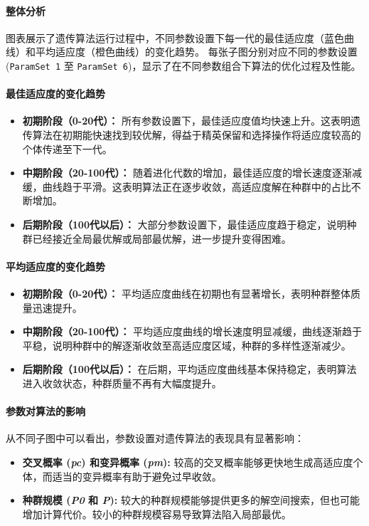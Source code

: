 \documentclass[journal,twoside,web]{ieeecolor}
\begin{document}
\paragraph{整体分析}
图表展示了遗传算法运行过程中，不同参数设置下每一代的最佳适应度（蓝色曲线）和平均适应度（橙色曲线）的变化趋势。
每张子图分别对应不同的参数设置 (\texttt{ParamSet 1} 至 \texttt{ParamSet 6})，显示了在不同参数组合下算法的优化过程及性能。

\paragraph{最佳适应度的变化趋势}
\begin{itemize}
    \item \textbf{初期阶段（0-20代）：}  
    所有参数设置下，最佳适应度值均快速上升。这表明遗传算法在初期能快速找到较优解，得益于精英保留和选择操作将适应度较高的个体传递至下一代。
    
    \item \textbf{中期阶段（20-100代）：}  
    随着进化代数的增加，最佳适应度的增长速度逐渐减缓，曲线趋于平滑。这表明算法正在逐步收敛，高适应度解在种群中的占比不断增加。
    
    \item \textbf{后期阶段（100代以后）：}  
    大部分参数设置下，最佳适应度趋于稳定，说明种群已经接近全局最优解或局部最优解，进一步提升变得困难。
\end{itemize}

\paragraph{平均适应度的变化趋势}
\begin{itemize}
    \item \textbf{初期阶段（0-20代）：}  
    平均适应度曲线在初期也有显著增长，表明种群整体质量迅速提升。
    
    \item \textbf{中期阶段（20-100代）：}  
    平均适应度曲线的增长速度明显减缓，曲线逐渐趋于平稳，说明种群中的解逐渐收敛至高适应度区域，种群的多样性逐渐减少。
    
    \item \textbf{后期阶段（100代以后）：}  
    在后期，平均适应度曲线基本保持稳定，表明算法进入收敛状态，种群质量不再有大幅度提升。
\end{itemize}

\paragraph{参数对算法的影响}
从不同子图中可以看出，参数设置对遗传算法的表现具有显著影响：
\begin{itemize}
    \item \textbf{交叉概率 (\textit{pc}) 和变异概率 (\textit{pm}):}  
    较高的交叉概率能够更快地生成高适应度个体，而适当的变异概率有助于避免过早收敛。
    
    \item \textbf{种群规模 (\textit{P0} 和 \textit{P}):}  
    较大的种群规模能够提供更多的解空间搜索，但也可能增加计算代价。较小的种群规模容易导致算法陷入局部最优。
\end{itemize}
\end{document}
